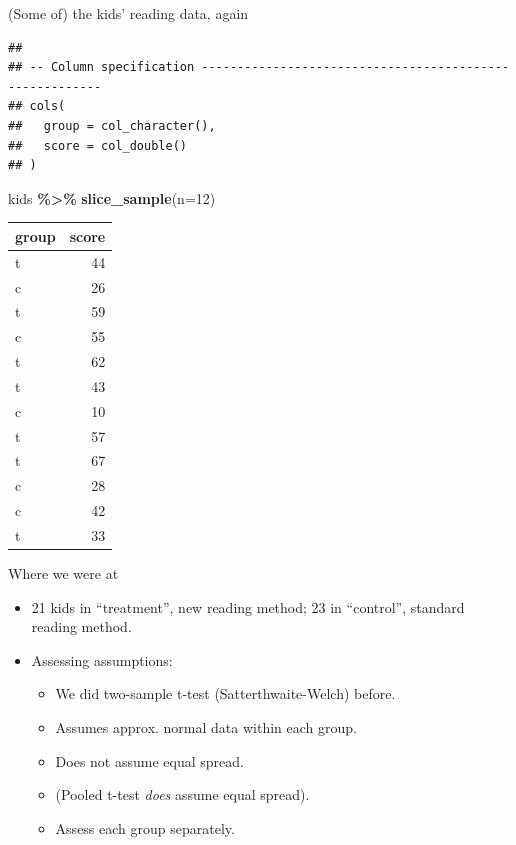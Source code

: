 \documentclass[
  ignorenonframetext,
]{beamer}
\newenvironment{Shaded}{\begin{snugshade}}{\end{snugshade}}
\newcommand{\DataTypeTok}[1]{\textcolor[rgb]{0.13,0.29,0.53}{#1}}
\newcommand{\DecValTok}[1]{\textcolor[rgb]{0.00,0.00,0.81}{#1}}
\newcommand{\KeywordTok}[1]{\textcolor[rgb]{0.13,0.29,0.53}{\textbf{#1}}}
\newcommand{\NormalTok}[1]{#1}
\newcommand{\OperatorTok}[1]{\textcolor[rgb]{0.81,0.36,0.00}{\textbf{#1}}}
\newcommand{\StringTok}[1]{\textcolor[rgb]{0.31,0.60,0.02}{#1}}
\providecommand{\tightlist}{%
  \setlength{\itemsep}{0pt}\setlength{\parskip}{0pt}}
\begin{document}
\begin{frame}[fragile]{(Some of) the kids' reading data, again}
\protect\hypertarget{some-of-the-kids-reading-data-again}{}
\begin{verbatim}
## 
## -- Column specification --------------------------------------------------------
## cols(
##   group = col_character(),
##   score = col_double()
## )
\end{verbatim}

\begin{Shaded}
\begin{Highlighting}[]
\NormalTok{kids }\OperatorTok{\%\textgreater{}\%}\StringTok{ }\KeywordTok{slice\_sample}\NormalTok{(}\DataTypeTok{n=}\DecValTok{12}\NormalTok{)}
\end{Highlighting}
\end{Shaded}

\begin{longtable}[]{@{}lr@{}}
\toprule
group & score\tabularnewline
\midrule
\endhead
t & 44\tabularnewline
c & 26\tabularnewline
t & 59\tabularnewline
c & 55\tabularnewline
t & 62\tabularnewline
t & 43\tabularnewline
c & 10\tabularnewline
t & 57\tabularnewline
t & 67\tabularnewline
c & 28\tabularnewline
c & 42\tabularnewline
t & 33\tabularnewline
\bottomrule
\end{longtable}
\end{frame}

\begin{frame}{Where we were at}
\protect\hypertarget{where-we-were-at}{}
\begin{itemize}
\item
  21 kids in ``treatment'', new reading method; 23 in ``control'',
  standard reading method.
\item
  Assessing assumptions:

  \begin{itemize}
  \tightlist
  \item
    We did two-sample t-test (Satterthwaite-Welch) before.
  \item
    Assumes approx. normal data within each group.
  \item
    Does not assume equal spread.
  \item
    (Pooled t-test \emph{does} assume equal spread).
  \item
    Assess each group separately.
  \end{itemize}
\end{itemize}
\end{frame}
\end{document}
